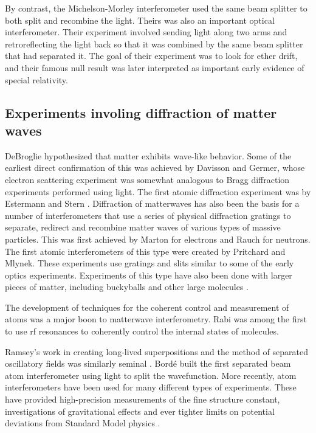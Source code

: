 By contrast, the Michelson-Morley interferometer used the same beam splitter to both split and recombine the light. Theirs was also an important optical interferometer. Their experiment involved sending light along two arms and retroreflecting the light back so that it was combined by the same beam splitter that had separated it. The goal of their experiment was to look for ether drift, and their famous null result was later interpreted as important early evidence of special relativity. 

\subsection{Experiments involing diffraction of matter waves}
DeBroglie hypothesized that matter exhibits wave-like behavior. Some of the earliest direct confirmation of this was achieved by Davisson and Germer\cite{davisson_and_germer}, whose electron scattering experiment was somewhat analogous to Bragg diffraction experiments performed using light. The first atomic diffraction experiment was by Estermann and Stern \cite{esterman_stern}\cite{Kronin_RMP}. Diffraction of matterwaves has also been the basis for a number of interferometers that use a series of physical diffraction gratings to separate, redirect and recombine matter waves of various types of massive particles. This was first achieved by Marton\cite{electronGrating} for electrons and Rauch\cite{neutronGrating} for neutrons. The first atomic interferometers of this type were created by Pritchard\cite{pritchard1991} and Mlynek\cite{youngDoubleSlit_Carnal_Mlynek}. These experiments use gratings and slits similar to some of the early optics experiments. Experiments of this type have also been done with larger pieces of matter, including buckyballs\cite{C60_interferometry} and other large molecules \cite{large_molecule_interferometry}.

The development of techniques for the coherent control and measurement of atoms was a major boon to matterwave interferometry\cite{Kronin_RMP}. Rabi was among the first to use rf resonances to coherently control the internal states of molecules\cite{RabiOriginal}\cite{Kronin_RMP}. 

Ramsey's work in creating long-lived superpositions and the method of separated oscillatory fields was similarly seminal \cite{Kronin_RMP}\cite{Ramsey_original}. 
Bord\'e built \cite{borde_interferometer} the first separated beam atom interferometer using light to split the wavefunction. 
More recently, atom interferometers have been used for many different types of experiments. These have provided high-precision measurements of the fine structure constant\cite{WichtFineStructure}\cite{WeissFineStructure}\cite{GibbleFineStructure}, investigations of gravitational effects \cite{mullerIsotropyGR}\cite{KasevichGravWaves} and ever tighter limits on potential deviations from Standard Model physics\cite{mullerLorentzInvarianceElectrodynamics}  \cite{Kronin_RMP}\cite{KasevichInertial}.

